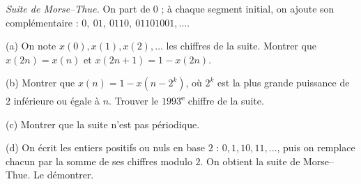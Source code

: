 \emph{Suite de Morse–Thue.} On part de $0$ ; à chaque segment initial, on ajoute son complémentaire : $0,\ 01,\ 0110,\ 01101001, \ldots$.

(a) On note $x(0), x(1), x(2), \ldots$ les chiffres de la suite. Montrer que $x(2n) = x(n)$ et $x(2n+1) = 1 - x(2n)$.

(b) Montrer que $x(n) = 1 - x(n - 2^k)$, où $2^k$ est la plus grande puissance de $2$ inférieure ou égale à $n$. Trouver le $1993$\textsuperscript{e} chiffre de la suite.

(c) Montrer que la suite n'est pas périodique.

(d) On écrit les entiers positifs ou nuls en base $2$ : $0, 1, 10, 11, \ldots$, puis on remplace chacun par la somme de ses chiffres modulo $2$. On obtient la suite de Morse–Thue. Le démontrer.
